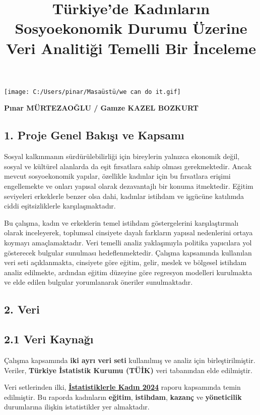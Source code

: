 \documentclass[
  11pt,
  a4paper,
  DIV=11,
  numbers=noendperiod]{scrartcl}
\title{Türkiye'de Kadınların Sosyoekonomik Durumu Üzerine Veri Analitiği
Temelli Bir İnceleme}
\author{}
\date{}
\begin{document}
\maketitle


\texttt{[image: C:/Users/pinar/Masaüstü/we can do it.gif]}

\textbf{Pınar MÜRTEZAOĞLU / Gamze KAZEL BOZKURT}

\subsection{1. Proje Genel Bakışı ve
Kapsamı}\label{proje-genel-bakux131ux15fux131-ve-kapsamux131}

Sosyal kalkınmanın sürdürülebilirliği için bireylerin yalnızca ekonomik
değil, sosyal ve kültürel alanlarda da eşit fırsatlara sahip olması
gerekmektedir. Ancak mevcut sosyoekonomik yapılar, özellikle kadınlar
için bu fırsatlara erişimi engellemekte ve onları yapısal olarak
dezavantajlı bir konuma itmektedir. Eğitim seviyeleri erkeklerle benzer
olsa dahi, kadınlar istihdam ve işgücüne katılımda ciddi eşitsizliklerle
karşılaşmaktadır.

Bu çalışma, kadın ve erkeklerin temel istihdam göstergelerini
karşılaştırmalı olarak inceleyerek, toplumsal cinsiyete dayalı farkların
yapısal nedenlerini ortaya koymayı amaçlamaktadır. Veri temelli analiz
yaklaşımıyla politika yapıcılara yol gösterecek bulgular sunulması
hedeflenmektedir. Çalışma kapsamında kullanılan veri seti açıklanmakta,
cinsiyete göre eğitim, gelir, meslek ve bölgesel istihdam analiz
edilmekte, ardından eğitim düzeyine göre regresyon modelleri kurulmakta
ve elde edilen bulgular yorumlanarak öneriler sunulmaktadır.

\subsection{2. Veri}\label{veri}

\subsection{2.1 Veri Kaynağı}\label{veri-kaynaux11fux131}

Çalışma kapsamında \textbf{iki ayrı veri seti} kullanılmış ve analiz
için birleştirilmiştir. Veriler, \textbf{Türkiye İstatistik Kurumu
(TÜİK)} veri tabanından elde edilmiştir.

Veri setlerinden ilki,
\href{https://data.tuik.gov.tr/Bulten/Index?p=Istatistiklerle-Kadin-2024-54076}{\textbf{İstatistiklerle
Kadın 2024}} raporu kapsamında temin edilmiştir. Bu raporda kadınların
\textbf{eğitim}, \textbf{istihdam}, \textbf{kazanç} ve
\textbf{yöneticilik} durumlarına ilişkin istatistikler yer almaktadır.
\end{document}
